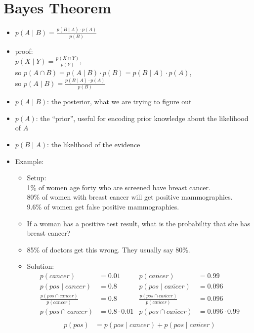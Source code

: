 \documentclass[11pt,letterpaper]{article}
\begin{document}
\section{Bayes Theorem}

\begin{itemize}
  \item $p(A \mid B) = \frac{p(B \mid A) \cdot p(A)}{p(B)}$
  \item proof:\\ 
  $p(X \mid Y) = \frac{p(X \cap Y)}{p(Y)}$,\\ 
  so $p(A \cap B) = p(A \mid B) \cdot p(B) = p(B \mid A) \cdot p(A)$,\\ 
  so $p(A \mid B) = \frac{p(B \mid A) \cdot p(A)}{p(B)}$
  \item $p(A \mid B)$: the posterior, what we are trying to figure out
  \item $p(A)$: the ``prior'', useful for encoding prior knowledge about the likelihood of $A$
  \item $p(B \mid A)$: the likelihood of the evidence
  \item Example:
  \begin{itemize}
    \item Setup:\\
    1\% of women age forty who are screened have breast cancer.\\
    80\% of women with breast cancer will get positive mammographies.\\
    9.6\% of women get false positive mammographies.
    \item If a woman has a positive test result, what is the probability that she has breast cancer?
    \item 85\% of doctors get this wrong.  They usually say 80\%.
    \item Solution:
    \begin{align*}
      p(cancer) &= 0.01 & p(\overline{cancer}) &= 0.99 \\
      p(pos \mid cancer) &= 0.8 & p(pos \mid \overline{cancer}) &= 0.096 \\
      \frac{p(pos \cap cancer)}{p(cancer)} &= 0.8 &
      \frac{p(pos \cap \overline{cancer})}{p(\overline{cancer})} &= 0.096 \\
      p(pos \cap cancer) &= 0.8 \cdot 0.01 & p(pos \cap \overline{cancer}) &= 0.096 \cdot 0.99 \\
    \end{align*}
    \begin{align*}
      p(pos) &= p(pos \mid cancer) + p(pos \mid \overline{cancer}) \\ 

\end{align*}
\end{itemize}
\end{itemize}
\end{document}
